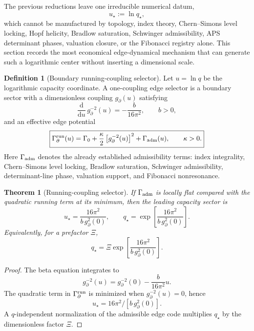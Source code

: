 \documentclass[aps,prd,reprint,nofootinbib,superscriptaddress,floatfix]{revtex4-2}
\numberwithin{equation}{section}
\theoremstyle{definition}
\newtheorem{definition}{Definition}[section]
\theoremstyle{plain}
\newtheorem{theorem}{Theorem}[section]
\newcommand{\dd}{\mathrm d}
\begin{document}
The previous reductions leave one irreducible numerical datum,
\begin{equation}
u_\star:=\ln q_\star,
\end{equation}
which cannot be manufactured by topology, index theory, Chern--Simons level
locking, Hopf helicity, Bradlow saturation, Schwinger admissibility, APS
determinant phases, valuation closure, or the Fibonacci registry alone.
This section records the most economical edge-dynamical mechanism that can
generate such a logarithmic center without inserting a dimensional scale.

\begin{definition}[Boundary running-coupling selector]
Let \(u=\ln q\) be the logarithmic capacity coordinate.  A one-coupling
edge selector is a boundary sector with a dimensionless coupling
\(g_\partial(u)\) satisfying
\begin{equation}
\frac{\dd}{\dd u}\,g_\partial^{-2}(u)
=
-\frac{b}{16\pi^2},
\qquad b>0,
\end{equation}
and an effective edge potential
\begin{equation}
\boxed{
\Gamma_{\partial}^{\rm run}(u)
=
\Gamma_0+
\frac{\kappa}{2}
\left[g_\partial^{-2}(u)\right]^2
+
\Gamma_{\rm adm}(u),
\qquad
\kappa>0 .
}
\end{equation}
Here \(\Gamma_{\rm adm}\) denotes the already established admissibility
terms: index integrality, Chern--Simons level locking, Bradlow saturation,
Schwinger admissibility, determinant-line phase, valuation support, and
Fibonacci nonresonance.
\end{definition}

\begin{theorem}[Running-coupling selector]
If \(\Gamma_{\rm adm}\) is locally flat compared with the quadratic
running term at its minimum, then the leading capacity sector is
\begin{equation}
\boxed{
u_\star
=
\frac{16\pi^2}{b\,g_\partial^2(0)} ,
\qquad
q_\star=\exp\!\left[\frac{16\pi^2}{b\,g_\partial^2(0)}\right].
}
\end{equation}
Equivalently, for a prefactor \(\Xi\),
\begin{equation}
\boxed{
q_\star=\Xi\exp\!\left[\frac{16\pi^2}{b\,g_\partial^2(0)}\right].
}
\end{equation}
\end{theorem}

\begin{proof}
The beta equation integrates to
\begin{equation}
g_\partial^{-2}(u)
=
g_\partial^{-2}(0)-\frac{b}{16\pi^2}u .
\end{equation}
The quadratic term in \(\Gamma_{\partial}^{\rm run}\) is minimized when
\(g_\partial^{-2}(u)=0\), hence
\[
u_\star=16\pi^2/[b\,g_\partial^2(0)] .
\]
A \(q\)-independent normalization of the admissible edge code multiplies
\(q_\star\) by the dimensionless factor \(\Xi\).
\end{proof}
\end{document}
